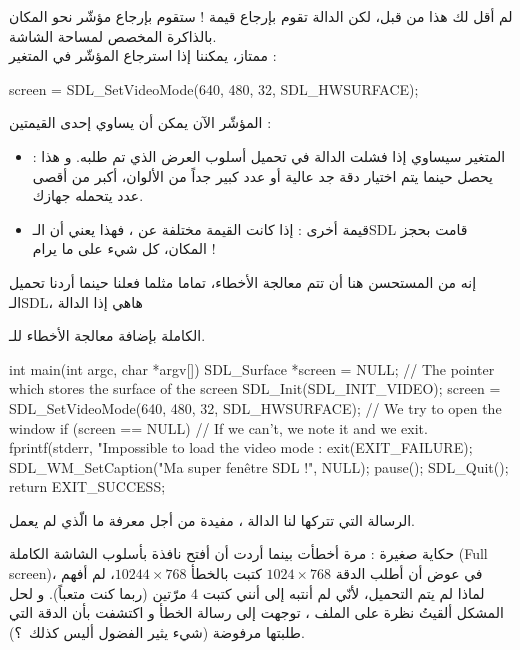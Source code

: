 لم أقل لك هذا من قبل، لكن الدالة
تقوم بإرجاع قيمة ! ستقوم بإرجاع مؤشّر نحو المكان بالذاكرة المخصص لمساحة الشاشة.\\
ممتاز، يمكننا إذا استرجاع المؤشّر في المتغير 
 :

\begin{Csource}
screen = SDL_SetVideoMode(640, 480, 32, SDL_HWSURFACE);
\end{Csource}

المؤشّر الآن يمكن أن يساوي إحدى القيمتين :

\begin{itemize}
	\item {} :
	المتغير 
	سيساوي
	إذا فشلت الدالة
	في تحميل أسلوب العرض الذي تم طلبه. و هذا يحصل حينما يتم اختيار دقة جد عالية أو عدد كبير جداً من الألوان، أكبر من أقصى عدد يتحمله جهازك.
	\item قيمة أخرى : إذا كانت القيمة مختلفة عن 
	،
	فهذا يعني أن الـ\textenglish{SDL}
	قامت بحجز المكان، كل شيء على ما يرام !
\end{itemize}

إنه من المستحسن هنا أن تتم معالجة الأخطاء، تماما مثلما فعلنا حينما أردنا تحميل الـ\textenglish{SDL}،
هاهي إذا الدالة

الكاملة بإضافة معالجة الأخطاء للـ.

\begin{Csource}
int main(int argc, char *argv[])
{
	SDL_Surface *screen = NULL; // The pointer which stores the surface of the screen
	SDL_Init(SDL_INIT_VIDEO);
	screen = SDL_SetVideoMode(640, 480, 32, SDL_HWSURFACE); // We try to open the window
	if (screen  == NULL) // If we can't, we note it and we exit.
	{
		fprintf(stderr, "Impossible to load the video mode : %
		exit(EXIT_FAILURE);
	}
	SDL_WM_SetCaption("Ma super fenêtre SDL !", NULL);
	pause();
	SDL_Quit();
	return EXIT_SUCCESS;
}
\end{Csource}

الرسالة التي تتركها لنا الدالة
،
مفيدة من أجل معرفة ما الّذي لم يعمل.

\begin{information}
حكاية صغيرة : مرة أخطأت بينما أردت أن أفتح نافذة بأسلوب الشاشة الكاملة 
(\textenglish{Full screen})،
في عوض أن أطلب الدقة
$1024 \times 768$
كتبت بالخطأ 
$10244 \times 768$،
لم أفهم لماذا لم يتم التحميل، لأنّي لم أنتبه إلى أنني كتبت 4 مرّتين (ربما كنت متعباً). و لحل المشكل ألقيتُ نظرة على الملف 
،
توجهت إلى رسالة الخطأ و اكتشفت بأن الدقة التي طلبتها مرفوضة (شيء يثير الفضول أليس كذلك~؟).
\end{information}

